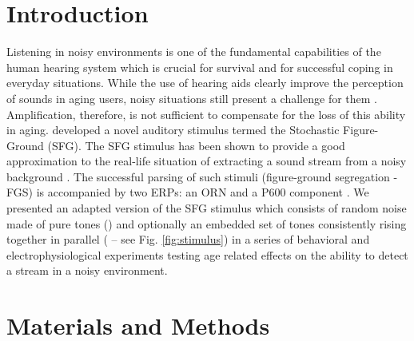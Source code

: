 \documentclass[a0,portrait]{a0poster}
\begin{document}
\vspace{0cm} %


\begin{multicols}{2} %


\color{DarkSlateGray} %

\section*{Introduction}
\large
Listening in noisy environments is one of the fundamental capabilities of the human hearing system which is crucial for survival and for successful coping in everyday situations. While the use of hearing aids clearly improve the perception of sounds in aging users, noisy situations still present a challenge for them \autocite{Wu2013}. Amplification, therefore, is not sufficient to compensate for the loss of this ability in aging. \textcite{Teki2011} developed a novel auditory stimulus termed the Stochastic Figure-Ground (SFG). The SFG stimulus has been shown to provide a good approximation to the real-life situation of extracting a sound stream from a noisy background \autocite{Dykstra2017, Teki2013}. The successful parsing of such stimuli (figure-ground segregation - FGS) is accompanied by two ERPs: an ORN and a P600 component \autocite{Dykstra2017, Toth2016}. We presented an adapted version of the SFG stimulus \autocite{OSullivan2015} which consists of random noise made of pure tones () and optionally an embedded set of tones consistently rising together in parallel ( -- see Fig. \ref{fig:stimulus}) in a series of behavioral and electrophysiological experiments testing age related effects on the ability to detect a stream in a noisy environment.

\section*{Materials and Methods}


\end{multicols}
\end{document}
